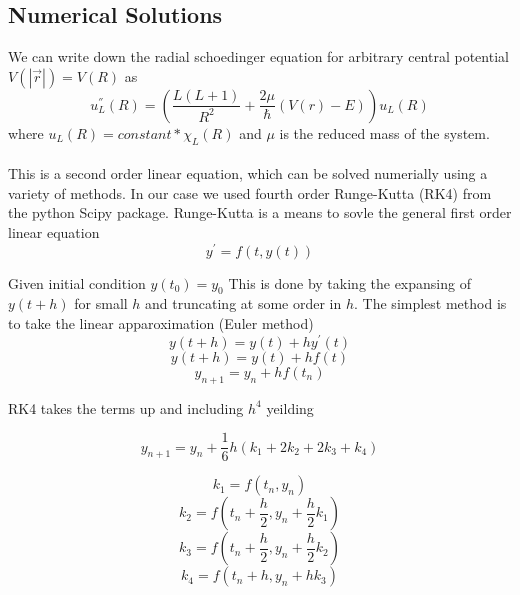 \documentclass[11pt]{article} %
\begin{document}
\subsection{Numerical Solutions}

We can write down the radial schoedinger equation for arbitrary central potential $V(|\vec{r}|)=V(R)$ as \\
\begin{equation}
u_{L}^{''}(R)=\left(\frac{L(L+1)}{R^2}+\frac{2\mu}{\hbar}(V(r)-E)\right)u_{L}(R)
\end{equation}
where $u_{L}(R)=constant*\chi_{L}(R)$ and $\mu$ is the reduced mass of the system. \\ \\
This is a second order linear equation, which can be solved numerially using a variety of methods.  In our case we used fourth order
Runge-Kutta (RK4) from the python Scipy package.  Runge-Kutta is a means to sovle the general first order linear equation
\begin{equation}
y^{'}=f(t,y(t))
\end{equation}

Given initial condition $y(t_{0})=y_{0}$  This is done by taking the expansing of $y(t+h)$ for small $h$ and truncating at some order in $h$.  The simplest method is 
to take the linear apparoximation (Euler method) 
\begin{equation}
y(t+h)=y(t)+hy^{'}(t)
\end{equation}
\begin{equation}
y(t+h)=y(t)+hf(t)
\end{equation}
\begin{equation}
y_{n+1}=y_{n}+hf(t_{n})
\end{equation}

RK4 takes the terms up and including $h^4$ yeilding

\begin{equation}
y_{n+1}=y_{n}+\frac{1}{6}h(k_1 +2k_2 +2k_3 +k_4)
\end{equation}

\begin{equation}
k_1=f(t_n,y_n)
\end{equation}
\begin{equation}
k_2=f(t_n+\frac{h}{2},y_n+\frac{h}{2}k_1)
\end{equation}
\begin{equation}
k_3=f(t_n+\frac{h}{2},y_n+\frac{h}{2}k_2)
\end{equation}
\begin{equation}
k_4=f(t_n+h,y_n+hk_3)
\end{equation}
\end{document}
